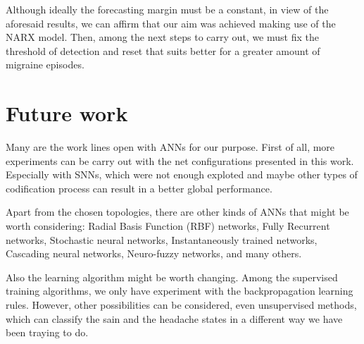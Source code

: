 Although ideally the forecasting margin must be a constant, in view of the aforesaid results, we can affirm that our aim was achieved making use of the NARX model. Then, among the next steps to carry out, we must fix the threshold of detection and reset that suits better for a greater amount of migraine episodes.

\section{Future work}
\label{sec:futurework}

Many are the work lines open with ANNs for our purpose. 
First of all, more experiments can be carry out with the net configurations presented in this work. 
Especially with SNNs, which were not enough exploted and maybe other types of codification process can result in a better global performance. 

Apart from the chosen topologies, there are other kinds of ANNs that might be worth considering: Radial Basis Function (RBF) networks, Fully Recurrent networks, Stochastic neural networks, Instantaneously trained networks, Cascading neural networks, Neuro-fuzzy networks, and many others.

Also the learning algorithm might be worth changing. Among the supervised training algorithms, we only have experiment with the backpropagation learning rules. However, other possibilities can be considered, even unsupervised methods, which can classify the sain and the headache states in a different way we have been traying to do.


